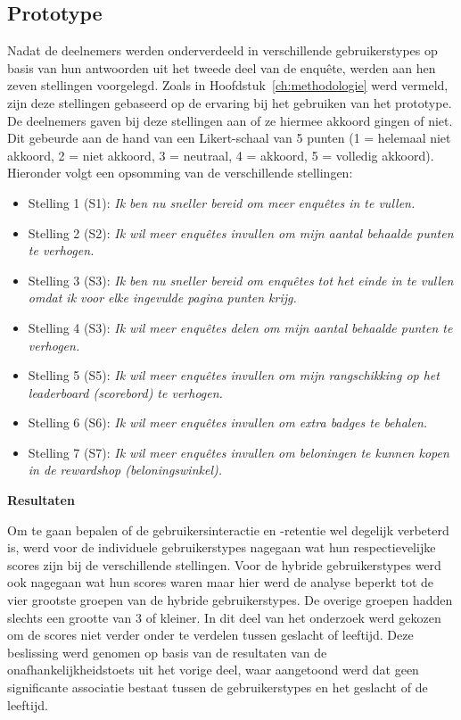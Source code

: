 \subsection{Prototype}

Nadat de deelnemers werden onderverdeeld in verschillende gebruikerstypes op basis van hun antwoorden uit het tweede deel van de enquête, werden aan hen zeven stellingen voorgelegd. Zoals in Hoofdstuk~\ref{ch:methodologie} werd vermeld, zijn deze stellingen gebaseerd op de ervaring bij het gebruiken van het prototype. De deelnemers gaven bij deze stellingen aan of ze hiermee akkoord gingen of niet. Dit gebeurde aan de hand van een Likert-schaal van 5 punten (1 = helemaal niet akkoord, 2 = niet akkoord, 3 = neutraal, 4 = akkoord, 5 = volledig akkoord). Hieronder volgt een opsomming van de verschillende stellingen:

\begin{itemize}
    \item Stelling 1 (S1): \textit{Ik ben nu sneller bereid om meer enquêtes in te vullen.}
    \item Stelling 2 (S2): \textit{Ik wil meer enquêtes invullen om mijn aantal behaalde punten te verhogen.}
    \item Stelling 3 (S3): \textit{Ik ben nu sneller bereid om enquêtes tot het einde in te vullen omdat ik voor elke ingevulde pagina punten krijg.}
    \item Stelling 4 (S3): \textit{Ik wil meer enquêtes delen om mijn aantal behaalde punten te verhogen.}
    \item Stelling 5 (S5): \textit{Ik wil meer enquêtes invullen om mijn rangschikking op het leaderboard (scorebord) te verhogen.}
    \item Stelling 6 (S6): \textit{Ik wil meer enquêtes invullen om extra badges te behalen.}
    \item Stelling 7 (S7): \textit{Ik wil meer enquêtes invullen om beloningen te kunnen kopen in de rewardshop (beloningswinkel).}
\end{itemize}

\textbf{Resultaten}

Om te gaan bepalen of de gebruikersinteractie en -retentie wel degelijk verbeterd is, werd voor de individuele gebruikerstypes nagegaan wat hun respectievelijke scores zijn bij de verschillende stellingen. Voor de hybride gebruikerstypes werd ook nagegaan wat hun scores waren maar hier werd de analyse beperkt tot de vier grootste groepen van de hybride gebruikerstypes. De overige groepen hadden slechts een grootte van 3 of kleiner. In dit deel van het onderzoek werd gekozen om de scores niet verder onder te verdelen tussen geslacht of leeftijd. Deze beslissing werd genomen op basis van de resultaten van de onafhankelijkheidstoets uit het vorige deel, waar aangetoond werd dat geen significante associatie bestaat tussen de gebruikerstypes en het geslacht of de leeftijd.

